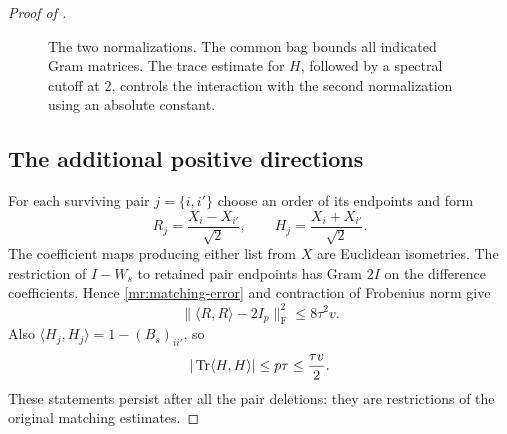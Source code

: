\begin{proof}[Proof of ]
\begin{figure}[tb]
\centering
{}
\caption{The two normalizations.  The common bag bounds all indicated
Gram matrices.  The trace estimate for $H$, followed by a spectral cutoff
at $2$, controls the interaction with the second normalization using an
absolute constant.}
\label{mr:two-scales}
\end{figure}

\subsection{The additional positive directions}

For each surviving pair $j=\{i,i'\}$ choose an order of its endpoints
and form
\[
 R_j=\frac{X_i-X_{i'}}{\sqrt2},
 \qquad H_j=\frac{X_i+X_{i'}}{\sqrt2}.
\]
The coefficient maps producing either list from $X$ are Euclidean
isometries.  The restriction of $I-W_s$ to retained pair endpoints has
Gram $2I$ on the difference coefficients.  Hence
\eqref{mr:matching-error} and contraction of Frobenius norm give
\begin{equation}\label{mr:R-bound}
 \|\langle R,R\rangle-2I_p\|_{\mathrm F}^2\le8\tau^2v.
\end{equation}
Also $\langle H_j,H_j\rangle=1-(B_s)_{ii'}$, so
\begin{equation}\label{mr:H-trace}
 |\operatorname{Tr}\langle H,H\rangle|\le p\tau\le\frac{\tau v}{2}.
\end{equation}
These statements persist after all the pair deletions: they are
restrictions of the original matching estimates.


\end{proof}
